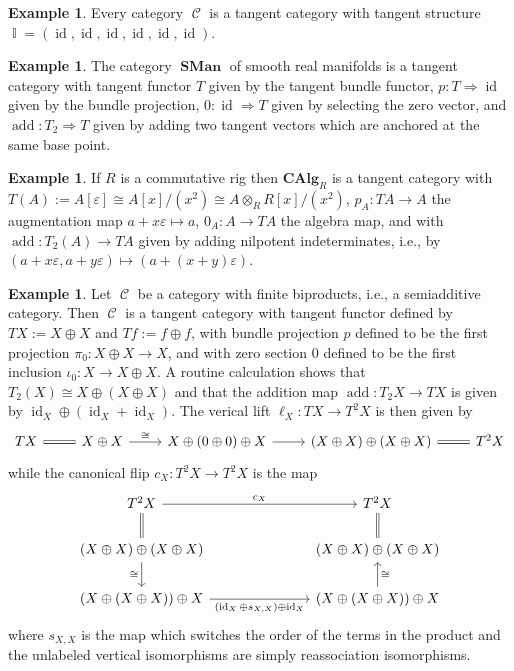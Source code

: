 \documentclass{amsart}
\theoremstyle{definition}
\newtheorem{example}[equation]{Example}
\DeclareMathOperator{\Cscr}{\mathscr{C}}
\DeclareMathOperator{\Ibb}{\mathbb{I}}
\DeclareMathOperator{\id}{id}
\DeclareMathOperator{\SMan}{\mathbf{SMan}}
\newcommand{\CAlg}[1]{\mathbf{CAlg}_{#1}}
\let\epsilon\varepsilon
\let\epsilon\varepsilon
\numberwithin{equation}{subsection}
\begin{document}
\begin{example}
Every category $\Cscr$ is a tangent category with tangent structure $\Ibb = (\id, \id, \id, \id, \id, \id)$.
\end{example}
\begin{example}
The category $\SMan$ of smooth real manifolds is a tangent category with tangent functor $T$ given by the tangent bundle functor, $p:T \Rightarrow \id$ given by the bundle projection, $0:\id \Rightarrow T$ given by selecting the zero vector, and $\operatorname{add}:T_2 \Rightarrow T$ given by adding two tangent vectors which are anchored at the same base point.
\end{example}
\begin{example}\label{Example: Tangent Structure on CAlgR}
If $R$ is a commutative rig then $\CAlg{R}$ is a tangent category with $T(A) := A[\epsilon] \cong A[x]/(x^2) \cong A \otimes_R R[x]/(x^2)$, $p_A:TA \to A$ the augmentation map $a + x\epsilon \mapsto a$, $0_A:A \to TA$ the algebra map, and with $\operatorname{add}:T_2(A) \to TA$ given by adding nilpotent indeterminates, i.e., by $(a+x\epsilon,a+y\epsilon) \mapsto (a+(x+y)\epsilon)$.
\end{example}
\begin{example}
Let $\Cscr$ be a category with finite biproducts, i.e., a semiadditive category. Then $\Cscr$ is a tangent category with tangent functor defined by $TX := X \oplus X$ and $Tf := f \oplus f$, with bundle projection $p$ defined to be the first projection $\pi_0:X \oplus X \to X$, and with zero section $0$ defined to be the first inclusion $\iota_0:X \to X \oplus X$. A routine calculation shows that $T_2(X) \cong X \oplus (X \oplus X)$ and that the addition map $\operatorname{add}:T_2X \to TX$ is given by $\id_X \oplus (\id_X + \id_X)$. %
The verical lift $\ell_X:TX \to T^2X$ is then given by
\[
\begin{tikzcd}
TX \ar[r, equals] & X \oplus X \ar[r]{}{\cong} &  X \oplus (0 \oplus 0) \oplus X \ar[r]{}{} & (X \oplus X) \oplus (X \oplus X) \ar[r, equals] & T^2X
\end{tikzcd}
\]
while the canonical flip $c_X:T^2X \to T^2X$ is the map
\[
\begin{tikzcd}
T^2X \ar[rrr]{}{c_X} \ar[d, equals] & & & T^2X \\
(X \oplus X) \oplus (X \oplus X) \ar[d, swap]{}{\cong} & & & (X \oplus X) \oplus (X \oplus X) \ar[u, equals] \\
(X \oplus (X \oplus X)) \oplus X \ar[rrr, swap]{}{(\id_X \oplus s_{X,X})\oplus \id_X} & & & (X \oplus (X \oplus X)) \oplus X \ar[u, swap]{}{\cong}
\end{tikzcd}
\]
where $s_{X,X}$ is the map which switches the order of the terms in the product and the unlabeled vertical isomorphisms are simply reassociation isomorphisms.
\end{example}
\end{document}

